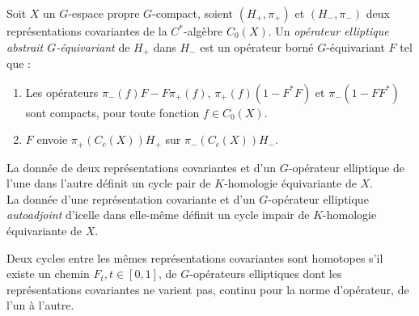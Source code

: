 \begin{definition}
Soit $X$ un $G$-espace propre $G$-compact, soient $(H_+,\pi_+)$ et $(H_-,\pi_-)$ deux représentations covariantes de la $C^*$-algèbre $C_0(X)$. Un \textit{opérateur elliptique abstrait $G$-équivariant} de $H_+$ dans $H_-$ est un opérateur borné $G$-équivariant $F$ tel que :
\begin{enumerate}
\item Les opérateurs $\pi_-(f)F-F\pi_+(f)$, $\pi_+(f)(1-F^*F)$ et $\pi_-(1-FF^*)$ sont compacts, pour toute fonction $f\in C_0(X)$.
\item $F$ envoie $\pi_+(C_c(X))H_+$ sur $\pi_-(C_c(X))H_-$.
\end{enumerate}
\end{definition}

\begin{definition}
La donnée de deux représentations covariantes et d'un $G$-opérateur elliptique de l'une dans l'autre définit un cycle pair de $K$-homologie équivariante de $X$.\\
La donnée d'une représentation covariante et d'un $G$-opérateur elliptique \textit{autoadjoint} d'icelle dans elle-même définit un cycle impair de $K$-homologie équivariante de $X$.\\
\end{definition}
\begin{definition}
Deux cycles entre les mêmes représentations covariantes sont homotopes s'il existe un chemin $F_t, t\in [0,1]$, de $G$-opérateurs elliptiques dont les représentations covariantes ne varient pas, continu pour la norme d'opérateur, de l'un à l'autre.\\
\end{definition}

